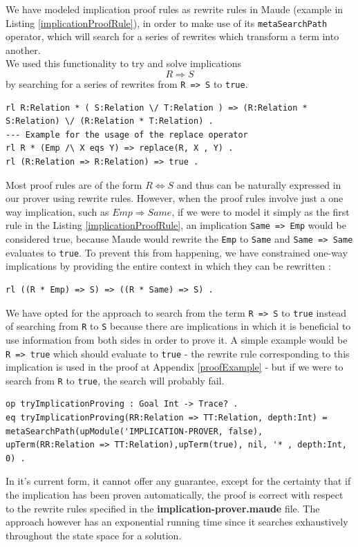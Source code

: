 \documentclass[12pt,a4paper]{article}
\begin{document}
{We have modeled implication proof rules as rewrite rules in Maude (example in Listing \ref{implicationProofRule}), in order to make use of its \texttt{metaSearchPath} operator, which will search for a series of rewrites which transform a term into another.
\\
We used this functionality to try and solve implications 
\[
	R \Rightarrow S
\]
by searching for a series of rewrites from \texttt{R => S} to \texttt{true}. 
\\ 
\begin{lstlisting}[label=implicationProofRule,caption=Example of implication rewrite rules]
rl R:Relation * ( S:Relation \/ T:Relation ) => (R:Relation * S:Relation) \/ (R:Relation * T:Relation) .
--- Example for the usage of the replace operator
rl R * (Emp /\ X eqs Y) => replace(R, X , Y) .
rl (R:Relation => R:Relation) => true .
\end{lstlisting}
Most proof rules are of the form \(R \Leftrightarrow S\) and thus can be naturally expressed in our prover using rewrite rules. However, when the proof rules involve just a one way implication, such as \(Emp \Rightarrow Same\), if we were to model it simply as the first rule in the Listing \ref{implicationProofRule}, an implication \texttt{Same => Emp} would be considered true, because Maude would rewrite the \texttt{Emp} to \texttt{Same} and \texttt{Same => Same} evaluates to \texttt{true}. To prevent this from happening, we have constrained one-way implications by providing the entire context in which they can be rewritten :
\begin{lstlisting}
rl ((R * Emp) => S) => ((R * Same) => S) .
\end{lstlisting}

We have opted for the approach to search from the term \texttt{R => S} to \texttt{true} instead of searching from \texttt{R} to \texttt{S} because there are implications in which it is beneficial to use information from both sides in order to prove it. A simple example would be \texttt{R => true} which should evaluate to \texttt{true} - the rewrite rule corresponding to this implication is used in the proof at Appendix \ref{proofExample} - but if we were to search from \texttt{R} to \texttt{true}, the search will probably fail.
  
\begin{lstlisting}[label=eqImplicationProving,caption=Equation using the metaSearchPath operator]
op tryImplicationProving : Goal Int -> Trace? .
eq tryImplicationProving(RR:Relation => TT:Relation, depth:Int) = metaSearchPath(upModule('IMPLICATION-PROVER, false), upTerm(RR:Relation => TT:Relation),upTerm(true), nil, '* , depth:Int, 0) . 
\end{lstlisting}
In it's current form, it cannot offer any guarantee, except for the certainty that if the implication has been proven automatically, the proof is correct with respect to the rewrite rules specified in the \textbf{implication-prover.maude} file. The approach however has an exponential running time since it searches exhaustively throughout the state space for a solution. \\

}
\end{document}
